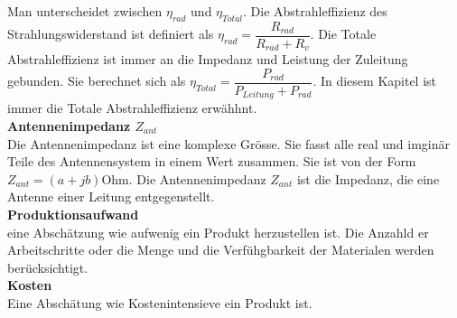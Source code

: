 Man unterscheidet zwischen $\eta_{rad}$ und $\eta_{Total}$. Die Abstrahleffizienz des Strahlungswiderstand ist definiert als $\eta_{rad}=\dfrac{R_{rad}}{R_{rad}+R_v}$. Die Totale Abstrahleffizienz ist immer an die Impedanz und Leistung der Zuleitung gebunden. Sie berechnet sich als $\eta_{Total}=\dfrac{P_{rad}}{P_{Leitung}+P_{rad}}$. In diesem Kapitel ist immer die Totale Abstrahleffizienz erwähhnt.\\
\textbf{Antennenimpedanz $Z_{ant}$}\\
Die Antennenimpedanz ist eine komplexe Grösse. Sie fasst alle real und imginär Teile des Antennensystem in einem Wert zusammen. Sie ist von der Form $Z_{ant}=(a+jb)$Ohm. Die Antennenimpedanz $Z_{ant}$ ist die Impedanz, die eine Antenne einer Leitung entgegenstellt.\\
\textbf{Produktionsaufwand}\\
eine Abschätzung wie aufwenig ein Produkt herzustellen ist. Die Anzahld er Arbeitschritte oder die Menge und die Verfühgbarkeit der Materialen werden berücksichtigt.\\
\textbf{Kosten}\\
Eine Abschätung wie Kostenintensieve ein Produkt ist.
\newpage 
\thispagestyle{empty}

